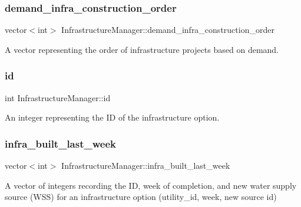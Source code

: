 \subsubsection{\texorpdfstring{demand\+\_\+infra\+\_\+construction\+\_\+order}{demand\_infra\_construction\_order}}
{\footnotesize\ttfamily vector$<$int$>$ Infrastructure\+Manager\+::demand\+\_\+infra\+\_\+construction\+\_\+order\hspace{0.3cm}{\ttfamily [private]}}



A vector representing the order of infrastructure projects based on demand. 

\mbox{\label{classInfrastructureManager_a9c721676ab3c35a247c818bf34fd482e}} 
\subsubsection{\texorpdfstring{id}{id}}
{\footnotesize\ttfamily int Infrastructure\+Manager\+::id\hspace{0.3cm}{\ttfamily [private]}}



An integer representing the ID of the infrastructure option. 

\mbox{\label{classInfrastructureManager_a5203fc0ae8e33885012415c1d0e27399}} 
\subsubsection{\texorpdfstring{infra\+\_\+built\+\_\+last\+\_\+week}{infra\_built\_last\_week}}
{\footnotesize\ttfamily vector$<$int$>$ Infrastructure\+Manager\+::infra\+\_\+built\+\_\+last\+\_\+week\hspace{0.3cm}{\ttfamily [private]}}



A vector of integers recording the ID, week of completion, and new water supply source (W\+SS) for an infrastructure option (utility\+\_\+id, week, new source id) 


